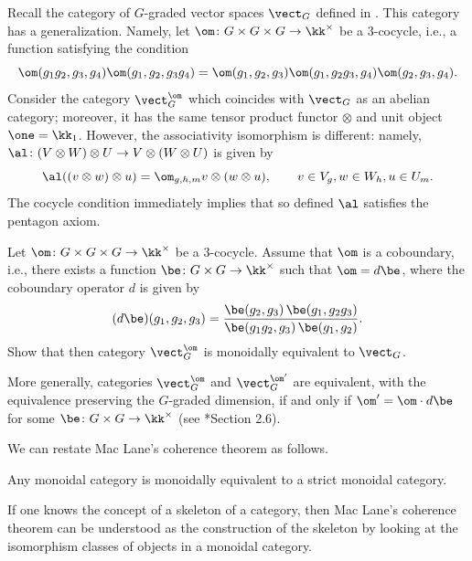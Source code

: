 \begin{example}\label{x:vecg-twisted}
  Recall the category of $G$-graded vector spaces $\vect_G$ defined in
  . This category has a generalization. Namely, let
  $\om\colon G\times G\times G\to \kk^\times$ be a 3-cocycle, i.e., a
  function satisfying the condition
  $$
  \om(g_1g_2, g_3, g_4)\om (g_1, g_2, g_3g_4) = \om(g_1, g_2, g_3)
     \om(g_1, g_2g_3, g_4)\om (g_2, g_3, g_4).
  $$
  Consider the category $\vect^\om_G$ which coincides with $\vect_G$ as an
  abelian category; moreover, it has the same tensor product functor $\otimes$
  and unit object $\one=\kk_1$. However, the associativity isomorphism is
  different: namely, $\al \colon (V\otimes W)\otimes U \to V \otimes (W\otimes
  U)$ is given by
  $$
    \al((v \otimes w) \otimes u )= \om_{g,h,m} v \otimes (w\otimes u),
    \qquad v\in V_g, w\in W_h, u\in U_m.
  $$
  The cocycle condition immediately implies that so defined $\al$ satisfies the
  pentagon axiom.
\end{example}
\begin{exercise}
  Let $\om\colon G\times G\times G\to \kk^\times$ be a 3-cocycle. Assume that
  $\om$ is a coboundary, i.e., there exists a function $\be\colon G\times
  G\to \kk^\times$ such that $\om=d\be$, where the coboundary operator $d$
  is given by
  $$
    (d\be)(g_1, g_2, g_3)=
    \frac{\be(g_2, g_3)\,\be(g_1, g_2g_3)}{\be(g_1g_2, g_3)\,\be(g_1, g_2)}.
  $$
  Show that then category $\vect_G^\om$ is monoidally equivalent to $\vect_G$.

  More generally, categories $\vect_G^\om$ and $\vect_G^{\om'}$ are equivalent,
  with the equivalence preserving the $G$-graded dimension, if and only if
  $\om'=\om \cdot d\be$ for some $\be\colon G\times G\to \kk^\times$ (see
  *{Section 2.6}).
\end{exercise}



We can restate Mac Lane's coherence theorem as follows.
\begin{theorem}\label{t:strictify}
  Any monoidal category is monoidally equivalent to a strict monoidal category.
\end{theorem}
If one knows the concept of a skeleton of a category, then Mac Lane's coherence
theorem can be understood as the construction of the skeleton by looking at the
isomorphism classes of objects in a monoidal category.






